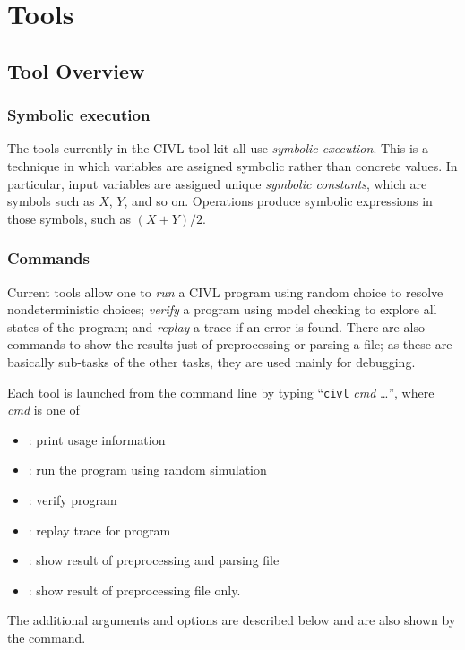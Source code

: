 \part{Tools}
\label{part:tools}

\chapter{Tool Overview}

\section{Symbolic execution}

The tools currently in the CIVL tool kit all use \emph{symbolic
  execution}.  This is a technique in which variables are assigned
symbolic rather than concrete values.  In particular, input variables
are assigned unique \emph{symbolic constants}, which are symbols such
as $X$, $Y$, and so on.  Operations produce symbolic expressions in
those symbols, such as $(X+Y)/2$.

\section{Commands}

Current tools allow one to \emph{run} a CIVL program using random
choice to resolve nondeterministic choices; \emph{verify} a program
using model checking to explore all states of the program; and
\emph{replay} a trace if an error is found.  There are also commands
to show the results just of preprocessing or parsing a file; as these
are basically sub-tasks of the other tasks, they are used mainly for
debugging.

Each tool is launched from the command line by typing ``\texttt{civl}
\textit{cmd} \ldots'', where \textit{cmd} is one of
\begin{itemize}
\item {} : print usage information
\item {}  : run the program using random simulation
\item {} : verify program
\item {} : replay trace for program
\item {} : show result of preprocessing and parsing file
\item {} : show result of preprocessing file only.
\end{itemize}
The additional arguments and options are described below and are also
shown by the  command.

